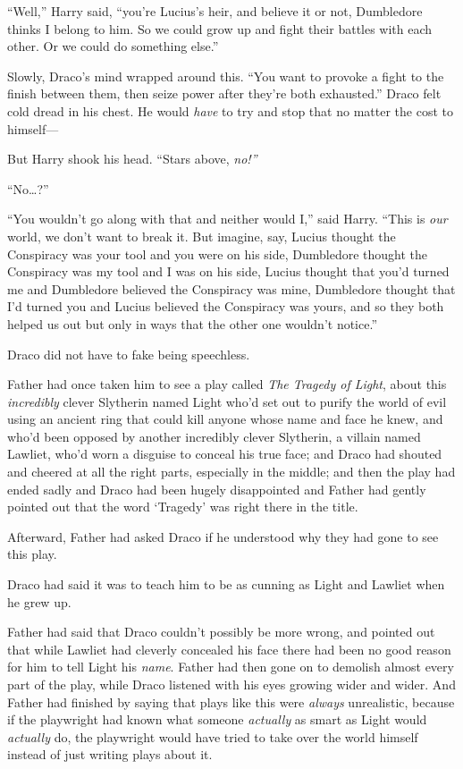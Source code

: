 ``Well,'' Harry said, ``you're Lucius's heir, and believe it or not,
Dumbledore thinks I belong to him. So we could grow up and fight their
battles with each other. Or we could do something else.''

Slowly, Draco's mind wrapped around this. ``You want to provoke a fight
to the finish between them, then seize power after they're both
exhausted.'' Draco felt cold dread in his chest. He would \emph{have} to
try and stop that no matter the cost to himself---

But Harry shook his head. ``Stars above, \emph{no!''}

``No\ldots{}?''

``You wouldn't go along with that and neither would I,'' said Harry.
``This is \emph{our} world, we don't want to break it. But imagine, say,
Lucius thought the Conspiracy was your tool and you were on his side,
Dumbledore thought the Conspiracy was my tool and I was on his side,
Lucius thought that you'd turned me and Dumbledore believed the
Conspiracy was mine, Dumbledore thought that I'd turned you and Lucius
believed the Conspiracy was yours, and so they both helped us out but
only in ways that the other one wouldn't notice.''

Draco did not have to fake being speechless.

Father had once taken him to see a play called \emph{The Tragedy of
Light}, about this \emph{incredibly} clever Slytherin named Light who'd
set out to purify the world of evil using an ancient ring that could
kill anyone whose name and face he knew, and who'd been opposed by
another incredibly clever Slytherin, a villain named Lawliet, who'd worn
a disguise to conceal his true face; and Draco had shouted and cheered
at all the right parts, especially in the middle; and then the play had
ended sadly and Draco had been hugely disappointed and Father had gently
pointed out that the word `Tragedy' was right there in the title.

Afterward, Father had asked Draco if he understood why they had gone to
see this play.

Draco had said it was to teach him to be as cunning as Light and Lawliet
when he grew up.

Father had said that Draco couldn't possibly be more wrong, and pointed
out that while Lawliet had cleverly concealed his face there had been no
good reason for him to tell Light his \emph{name}. Father had then gone
on to demolish almost every part of the play, while Draco listened with
his eyes growing wider and wider. And Father had finished by saying that
plays like this were \emph{always} unrealistic, because if the
playwright had known what someone \emph{actually} as smart as Light
would \emph{actually} do, the playwright would have tried to take over
the world himself instead of just writing plays about it.

